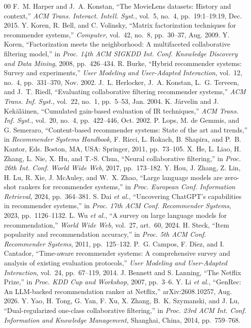 \documentclass[conference]{IEEEtran}
\begin{document}
\begin{thebibliography}{00}
 F.~M. Harper and J.~A. Konstan, ``The MovieLens datasets: History and context,'' \emph{ACM Trans. Interact. Intell. Syst.}, vol.~5, no.~4, pp.~19:1--19:19, Dec. 2015.
 Y. Koren, R. Bell, and C. Volinsky, ``Matrix factorization techniques for recommender systems,'' \emph{Computer}, vol.~42, no.~8, pp.~30--37, Aug. 2009.
 Y. Koren, ``Factorization meets the neighborhood: A multifaceted collaborative filtering model,'' in \emph{Proc. 14th ACM SIGKDD Int. Conf. Knowledge Discovery and Data Mining}, 2008, pp.~426--434.
 R. Burke, ``Hybrid recommender systems: Survey and experiments,'' \emph{User Modeling and User-Adapted Interaction}, vol.~12, no.~4, pp.~331--370, Nov. 2002.
 J.~L. Herlocker, J.~A. Konstan, L.~G. Terveen, and J.~T. Riedl, ``Evaluating collaborative filtering recommender systems,'' \emph{ACM Trans. Inf. Syst.}, vol.~22, no.~1, pp.~5--53, Jan. 2004.
 K. J\"{a}rvelin and J. Kek\"{a}l\"{a}inen, ``Cumulated gain-based evaluation of IR techniques,'' \emph{ACM Trans. Inf. Syst.}, vol.~20, no.~4, pp.~422--446, Oct. 2002.
 P. Lops, M. de Gemmis, and G. Semeraro, ``Content-based recommender systems: State of the art and trends,'' in \emph{Recommender Systems Handbook}, F. Ricci, L. Rokach, B. Shapira, and P.~B. Kantor, Eds. Boston, MA, USA: Springer, 2011, pp.~73--105.
 X. He, L. Liao, H. Zhang, L. Nie, X. Hu, and T.-S. Chua, ``Neural collaborative filtering,'' in \emph{Proc. 26th Int. Conf. World Wide Web}, 2017, pp.~173--182.
 Y. Hou, J. Zhang, Z. Lin, H. Lu, R. Xie, J. McAuley, and W.~X. Zhao, ``Large language models are zero-shot rankers for recommender systems,'' in \emph{Proc. European Conf. Information Retrieval}, 2024, pp.~364--381.
 S. Dai \emph{et al.}, ``Uncovering ChatGPT's capabilities in recommender systems,'' in \emph{Proc. 17th ACM Conf. Recommender Systems}, 2023, pp.~1126--1132.
 L. Wu \emph{et al.}, ``A survey on large language models for recommendation,'' \emph{World Wide Web}, vol.~27, art.~60, 2024.
 H. Steck, ``Item popularity and recommendation accuracy,'' in \emph{Proc. 5th ACM Conf. Recommender Systems}, 2011, pp.~125--132.
 P.~G. Campos, F. D\'{i}ez, and I. Cantador, ``Time-aware recommender systems: A comprehensive survey and analysis of existing evaluation protocols,'' \emph{User Modeling and User-Adapted Interaction}, vol.~24, pp.~67--119, 2014.
 J. Bennett and S. Lanning, ``The Netflix Prize,'' in \emph{Proc. KDD Cup and Workshop}, 2007, pp.~3--6.
 Y. Li \emph{et al.}, ``GenRec: An LLM-backed recommendation ranker at Netflix,'' arXiv:2608.10257, Aug. 2026.
 Y. Yao, H. Tong, G. Yan, F. Xu, X. Zhang, B.~K. Szymanski, and J. Lu, ``Dual-regularized one-class collaborative filtering,'' in \emph{Proc. 23rd ACM Int. Conf. Information and Knowledge Management}, Shanghai, China, 2014, pp.~759--768.
\end{thebibliography}
\end{document}
